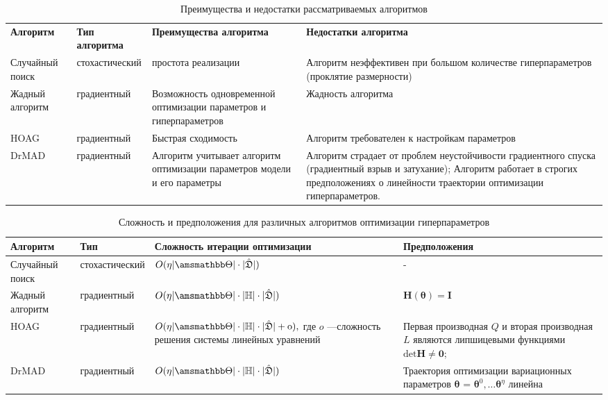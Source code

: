 \begin{table}[tbh!]
\small

\begin{tabularx}{\textwidth}{|X|X|X|X|}
\hline
\bf Алгоритм & \bf Тип алгоритма & \bf Преимущества алгоритма & \bf Недостатки алгоритма  \\ 
Случайный поиск & стохастический & простота реализации& Алгоритм неэффективен при большом количестве гиперпараметров (проклятие размерности)  \\ \hline
Жадный алгоритм~\cite{greed_hyper} & градиентный & Возможность одновременной оптимизации параметров и гиперпараметров & Жадность алгоритма \\ \hline
HOAG~\cite{hyper_hoag} & градиентный & Быстрая сходимость & Алгоритм требователен к настройкам параметров \\ \hline 
DrMAD~\cite{hyper_mad} & градиентный & Алгоритм учитывает алгоритм оптимизации параметров модели и его параметры & Алгоритм страдает от проблем неустойчивости градиентного спуска (градиентный взрыв и затухание); Алгоритм работает в строгих предположениях о линейности траектории оптимизации гиперпараметров.\\ \hline
\end{tabularx}

\caption{Преимущества и недостатки рассматриваемых алгоритмов}
\label{table:algo_descr}

\end{table}


\begin{table}[tbh!]
\small

\begin{tabularx}{\textwidth}{|X|X|X|X|}
\hline
\bf Алгоритм & \bf Тип & \bf Сложность итерации оптимизации & \bf Предположения \\ 
\hline
Случайный поиск & стохастический & $O(\eta |\Tetab|\cdot |\hat{\mathfrak{D}}|)$& -  \\ \hline
Жадный алгоритм~\cite{greed_hyper} & градиентный & $O(\eta |\Tetab|\cdot|\Hb|\cdot |\hat{\mathfrak{D}}|)$ & $\mathbf{H}(\boldsymbol{\theta}) = \mathbf{I}$  \\ \hline
HOAG~\cite{hyper_hoag} & градиентный & $O(\eta |\Tetab|\cdot|\Hb| \cdot |\hat{\mathfrak{D}}| + \text{o}),$ где $o$ ---сложность решения системы линейных уравнений& Первая производная $Q$  и вторая производная $L$  являются липшицевыми функциями  $\text{det}\mathbf{H} \neq \mathbf{0}$;  \\ \hline
DrMAD~\cite{hyper_mad} & градиентный &$O(\eta |\Tetab|\cdot|\Hb| \cdot|\hat{\mathfrak{D}}|)$ & Траектория оптимизации вариационных параметров $\boldsymbol{\theta}$ = $\boldsymbol{\theta}^0, \dots \boldsymbol{\theta}^\eta$  линейна \\ \hline
\end{tabularx}

\caption{Сложность и предположения для различных алгоритмов оптимизации гиперпараметров}
\label{table:algo_descr2}

\end{table}






